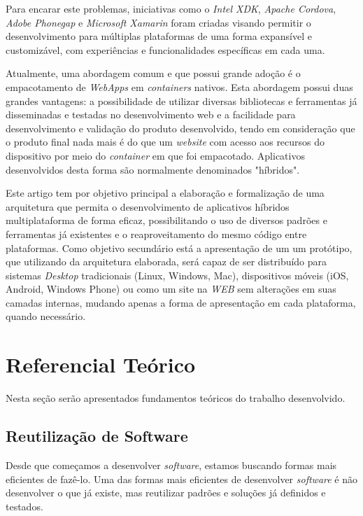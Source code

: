 Para encarar este problemas, iniciativas como o \textit{Intel XDK}, \textit{Apache Cordova}, \textit{Adobe Phonegap} e \textit{Microsoft Xamarin} foram criadas visando permitir o desenvolvimento para múltiplas plataformas de uma forma expansível e customizável, com experiências e funcionalidades específicas em cada uma. 

Atualmente, uma abordagem comum e que possui grande adoção é o empacotamento de \textit{WebApps} em \textit{containers} nativos. Esta abordagem possui duas grandes vantagens: a possibilidade de utilizar diversas bibliotecas e ferramentas já disseminadas e testadas no desenvolvimento web e a facilidade para desenvolvimento e validação do produto desenvolvido, tendo em consideração que o produto final nada mais é do que um \textit{website} com acesso aos recursos do dispositivo por meio do \textit{container} em que foi empacotado. Aplicativos desenvolvidos desta forma são normalmente denominados "híbridos".

Este artigo tem por objetivo principal a elaboração e formalização de uma arquitetura que permita o desenvolvimento de aplicativos híbridos multiplataforma de forma eficaz, possibilitando o uso de diversos padrões e ferramentas já existentes e o reaproveitamento do mesmo código entre plataformas. Como objetivo secundário está a apresentação de um um protótipo, que utilizando da arquitetura elaborada, será capaz de ser distribuído para sistemas \textit{Desktop} tradicionais (Linux, Windows, Mac), dispositivos móveis (iOS, Android, Windows Phone) ou como um site na \textit{WEB} sem alterações em suas camadas internas, mudando apenas a forma de apresentação em cada plataforma, quando necessário.

\section{\esp Referencial Teórico}

Nesta seção serão apresentados fundamentos teóricos do trabalho desenvolvido.

\subsection{\esp Reutilização de Software}

Desde que começamos a desenvolver \textit{software}, estamos buscando formas mais eficientes de fazê-lo. Uma das formas mais eficientes de desenvolver \textit{software} é não desenvolver o que já existe, mas reutilizar padrões e soluções já definidos e testados. 

